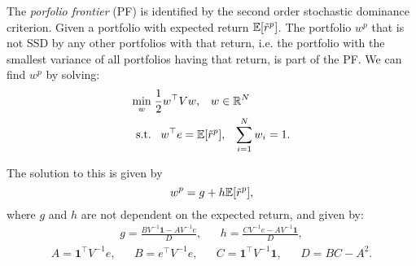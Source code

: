 \documentclass[twoside, titlepage]{article}
\begin{document}
The \textit{porfolio frontier} (PF) is identified by the second order stochastic dominance criterion. Given a portfolio with expected return $\mathbb{E}[\tilde{r}^p]$. The portfolio $w^p$ that is not SSD by any other portfolios with that return, i.e. the portfolio with the smallest variance of all portfolios having that return, is part of the PF. We can find $w^p$ by solving:
\begin{align*}
    \min_w& \;\frac{1}{2}w^\top V w, \;\;\; w \in \mathbb{R}^N \\
    \text{s.t.}&  \;\;\; w^\top e = \mathbb{E}[\tilde{r}^p], \;\;\; \sum_{i=1}^N w_i = 1.
\end{align*}

The solution to this is given by
\[
    w^p = g + h \mathbb{E}[\tilde{r}^p],
\]
where $g$ and $h$ are not dependent on the expected return, and given by:
\begin{align*}
    g = \frac{BV^{-1}\mathbf{1}-AV^{-1}e}{D}, && h = \frac{CV^{-1}e - AV^{-1}\mathbf{1}}{D},
\end{align*}
\vspace{-15pt}
\begin{align*}
    A = \mathbf{1}^\top V^{-1}e, && B = e^\top V^{-1}e, && C = \mathbf{1}^\top V^{-1} \mathbf{1}, && D = BC - A^2.
\end{align*}
\end{document}
